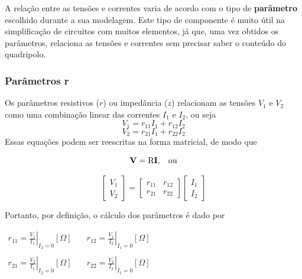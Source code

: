 \documentclass{article}
\numberwithin{equation}{section}
\begin{document}
    A relação entre as tensões e correntes varia de acordo com o tipo de \textbf{parâmetro} escolhido durante a sua modelagem. Este tipo de componente é muito útil na simplificação de circuitos com muitos elementos, já que, uma vez obtidos os parâmetros, relaciona as tensões e correntes sem precisar saber o conteúdo do quadripolo.

    \subsubsection{Parâmetros r}
    \label{subsubsec:quadripolosr}
    Os parâmetros resistivos ($r$) ou impedância ($z$) relacionam as tensões $V_{1}$ e $V_{2}$ como uma combinação linear das correntes $I_{1}$ e $I_{2}$, ou seja
    \begin{equation*}
        V_{1}=r_{11}I_{1}+r_{12}I_{2}
    \end{equation*}
    \begin{equation*}
        V_{2}=r_{21}I_{1}+r_{22}I_{2}
    \end{equation*}
    Essas equações podem ser reescritas na forma matricial, de modo que

    \begin{equation*}
        \textbf{V}=\text{R}\textbf{I}, \hspace{0.3cm} \text{ou}
    \end{equation*}

    \begin{equation}
        \begin{bmatrix}
            V_{1} \\
            V_{2}
        \end{bmatrix}
        = %
        \begin{bmatrix}
            r_{11} & r_{12} \\
            r_{21} & r_{22}
        \end{bmatrix}
        \begin{bmatrix}
            I_{1} \\
            I_{2}
        \end{bmatrix}
    \end{equation}

    Portanto, por definição, o cálculo dos parâmetros é dado por
    \begin{center}
        $\begin{matrix} %
                r_{11}=\displaystyle\left.\frac{V_{1}}{I_{1}}\right|_{I_{2}=0} [\Omega] & \quad r_{12}=\displaystyle\left.\frac{V_{1}}{I_{2}}\right|_{I_{1}=0} [\Omega]\\ \\
                r_{21}=\displaystyle\left.\frac{V_{2}}{I_{1}}\right|_{I_{2}=0} [\Omega] & \quad  r_{22}=\displaystyle\left.\frac{V_{2}}{I_{2}}\right|_{I_{1}=0} [\Omega]
        \end{matrix}$
    \end{center}
\end{document}
